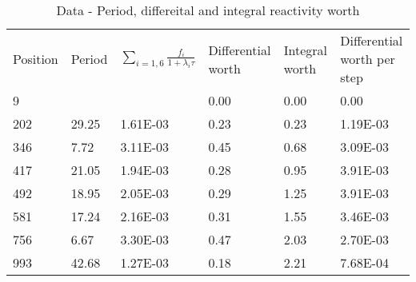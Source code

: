 \begin{table}[!htb]
    \centering
\begin{tabular}{llllll}
Position & Period & $\sum_{i=1,6}{\frac{f_i}{1+\lambda_i \tau}}$ & Differential worth & Integral worth  & Differential worth per step \\
9        &        &            & 0.00 & 0.00 & 0.00                           \\
202      & 29.25  & 1.61E-03   & 0.23 & 0.23 & 1.19E-03                       \\
346      & 7.72   & 3.11E-03   & 0.45 & 0.68 & 3.09E-03                       \\
417      & 21.05  & 1.94E-03   & 0.28 & 0.95 & 3.91E-03                       \\
492      & 18.95  & 2.05E-03   & 0.29 & 1.25 & 3.91E-03                       \\
581      & 17.24  & 2.16E-03   & 0.31 & 1.55 & 3.46E-03                       \\
756      & 6.67   & 3.30E-03   & 0.47 & 2.03 & 2.70E-03                       \\
993      & 42.68  & 1.27E-03   & 0.18 & 2.21 & 7.68E-04                      
\end{tabular}
        \caption{Data - Period, differeital and integral reactivity worth}\label{tab:data}
\end{table}



\
